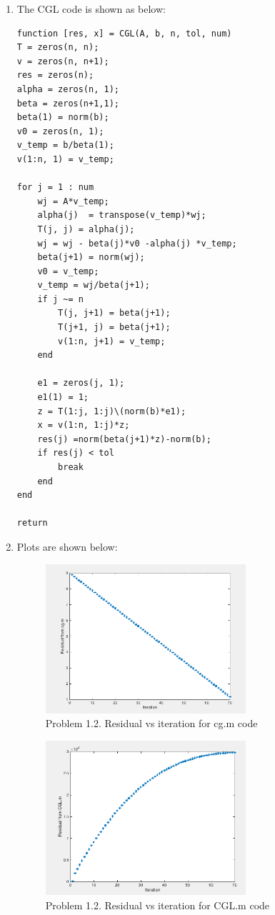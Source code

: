 \documentclass{article}
\begin{document}
\begin{enumerate} 
\item 
The CGL code is shown as below: \\
\begin{verbatim} 
function [res, x] = CGL(A, b, n, tol, num)
T = zeros(n, n);
v = zeros(n, n+1);
res = zeros(n);
alpha = zeros(n, 1); 
beta = zeros(n+1,1); 
beta(1) = norm(b); 
v0 = zeros(n, 1);
v_temp = b/beta(1);
v(1:n, 1) = v_temp;
  
for j = 1 : num
    wj = A*v_temp;
    alpha(j)  = transpose(v_temp)*wj;
    T(j, j) = alpha(j); 
    wj = wj - beta(j)*v0 -alpha(j) *v_temp;
    beta(j+1) = norm(wj);
    v0 = v_temp;
    v_temp = wj/beta(j+1);
    if j ~= n
        T(j, j+1) = beta(j+1);
        T(j+1, j) = beta(j+1);
        v(1:n, j+1) = v_temp;
    end
  
    e1 = zeros(j, 1); 
    e1(1) = 1; 
    z = T(1:j, 1:j)\(norm(b)*e1); 
    x = v(1:n, 1:j)*z;
    res(j) =norm(beta(j+1)*z)-norm(b);
    if res(j) < tol
        break
    end
end

return
\end{verbatim} 

\item 
Plots are shown below:  
\begin{figure} 
\includegraphics[width=0.7\textwidth]{problem1_2_cg}
\centering
\caption{Problem 1.2. Residual vs iteration for cg.m code} 
\end{figure} 

\begin{figure} 
\includegraphics[width=0.7\textwidth]{problem1_2_mine}
\centering
\caption{Problem 1.2.  Residual vs iteration for CGL.m code} 
\end{figure} 


\end{enumerate}
\end{document}
